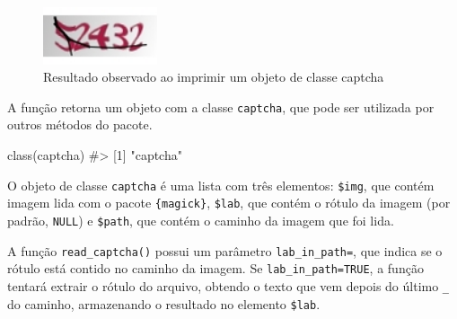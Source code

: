 \documentclass[12pt,twoside,brazilian]{book}
\newenvironment{Shaded}{\begin{snugshade}}{\end{snugshade}}
\newcommand{\CommentTok}[1]{\textcolor[rgb]{0.37,0.37,0.37}{#1}}
\newcommand{\FunctionTok}[1]{\textcolor[rgb]{0.28,0.35,0.67}{#1}}
\newcommand{\NormalTok}[1]{\textcolor[rgb]{0.00,0.23,0.31}{#1}}
\begin{document}
\begin{figure}[H]

{\centering \includegraphics[width=0.3\textwidth,height=\textheight]{./resultados_files/figure-pdf/fig-uso-basico-captcha-1.png}

}

\caption{\label{fig-uso-basico-captcha}Resultado observado ao imprimir
um objeto de classe captcha}

\end{figure}

A função retorna um objeto com a classe \texttt{captcha}, que pode ser
utilizada por outros métodos do pacote.

\begin{Shaded}
\begin{Highlighting}[]
\FunctionTok{class}\NormalTok{(captcha)}
\CommentTok{\#\textgreater{} [1] "captcha"}
\end{Highlighting}
\end{Shaded}

O objeto de classe \texttt{captcha} é uma lista com três elementos:
\texttt{\$img}, que contém imagem lida com o pacote \texttt{\{magick\}},
\texttt{\$lab}, que contém o rótulo da imagem (por padrão,
\texttt{NULL}) e \texttt{\$path}, que contém o caminho da imagem que foi
lida.

\begin{Shaded}
\end{Shaded}

A função \texttt{read\_captcha()} possui um parâmetro
\texttt{lab\_in\_path=}, que indica se o rótulo está contido no caminho
da imagem. Se \texttt{lab\_in\_path=TRUE}, a função tentará extrair o
rótulo do arquivo, obtendo o texto que vem depois do último \texttt{\_}
do caminho, armazenando o resultado no elemento \texttt{\$lab}.
\end{document}
